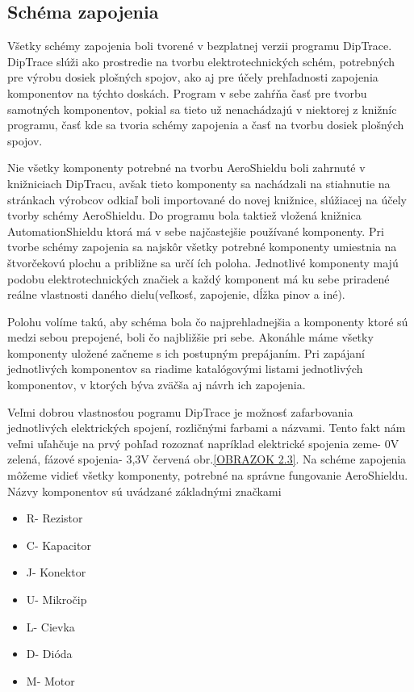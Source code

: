 \newpage


\subsection{Schéma zapojenia}

Všetky schémy zapojenia boli tvorené v bezplatnej verzii programu DipTrace. DipTrace slúži ako prostredie na tvorbu elektrotechnických schém, potrebných pre výrobu dosiek plošných spojov, ako aj pre účely prehľadnosti zapojenia komponentov na týchto doskách. Program v sebe zahŕňa časť pre tvorbu samotných komponentov, pokial sa tieto už nenachádzajú v niektorej z knižníc programu, časť kde sa tvoria schémy zapojenia a časť na tvorbu dosiek plošných spojov.

Nie všetky komponenty potrebné na tvorbu AeroShieldu boli zahrnuté v knižniciach DipTracu, avšak tieto komponenty sa nachádzali na stiahnutie na stránkach výrobcov odkiaľ boli importované do novej knižnice, slúžiacej na účely tvorby schémy AeroShieldu. Do programu bola taktiež vložená knižnica AutomationShieldu ktorá má v sebe najčastejšie používané komponenty. Pri tvorbe schémy zapojenia sa najskôr všetky potrebné komponenty umiestnia na štvorčekovú plochu a približne sa určí ích poloha. Jednotlivé komponenty majú podobu elektrotechnických značiek a každý komponent má ku sebe priradené reálne vlastnosti daného dielu(veľkosť, zapojenie, dĺžka pinov a iné).

Polohu volíme takú, aby schéma bola čo najprehladnejšia a komponenty ktoré sú medzi sebou prepojené, boli čo najbližšie pri sebe. Akonáhle máme všetky komponenty uložené začneme s ich postupným prepájaním. Pri zapájaní jednotlivých komponentov sa riadime katalógovými listami jednotlivých komponentov, v ktorých býva zväčša aj návrh ich zapojenia.

Veľmi dobrou vlastnosťou pogramu DipTrace je možnosť zafarbovania jednotlivých elektrických spojení, rozličnými farbami a názvami. Tento fakt nám veľmi uľahčuje na prvý pohľad rozoznať napríklad elektrické spojenia zeme- 0V zelená, fázové spojenia- 3,3V červená obr.\ref{OBRAZOK 2.3}. Na schéme zapojenia môžeme vidieť všetky komponenty, potrebné na správne fungovanie AeroShieldu. Názvy komponentov sú uvádzané základnými značkami
\begin{multicols}{3}
    \begin{itemize}
\item R- Rezistor
\item C- Kapacitor
\item J- Konektor
\item U- Mikročip
\item L- Cievka
\item D- Dióda
\item M- Motor
    \end{itemize}
    \end{multicols}


